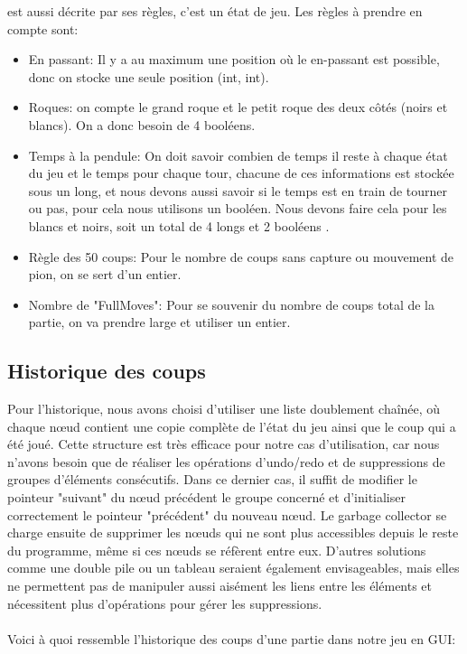 \documentclass{article}
\begin{document}
est aussi décrite par ses règles, c'est un état de jeu. Les règles à prendre en compte sont:\\
\begin{itemize}
   \item En passant: Il y a au maximum une position où le en-passant est possible, donc on stocke une seule position (int, int).
    \item Roques: on compte le grand roque et le petit roque des deux côtés (noirs et blancs). On a donc besoin de 4 booléens.
   \item Temps à la pendule: On doit savoir combien de temps il reste à chaque état du jeu et le temps pour chaque tour, chacune de ces informations est stockée sous un long, et nous devons aussi savoir si le temps est en train de tourner ou pas, pour cela nous utilisons un booléen. Nous devons faire cela pour les blancs et noirs, soit un total de 4 longs et 2 booléens .
   \item Règle des 50 coups: Pour le nombre de coups sans capture ou mouvement de pion, on se sert d’un entier.
   \item Nombre de "FullMoves": Pour se souvenir du nombre de coups total de la partie, on va prendre large et utiliser un entier.\\
\end{itemize}

\subsection{Historique des coups}
\par Pour l'historique, nous avons choisi d'utiliser une liste doublement chaînée, où chaque nœud contient une copie complète de l'état du jeu ainsi que le coup qui a été joué.
Cette structure est très efficace pour notre cas d'utilisation, car nous n'avons besoin que de réaliser les opérations d'undo/redo et de suppressions de groupes d'éléments consécutifs. Dans ce dernier cas, il suffit de modifier le pointeur "suivant" du nœud précédent le groupe concerné et d'initialiser correctement le pointeur "précédent" du nouveau nœud. Le garbage collector se charge ensuite de supprimer les nœuds qui ne sont plus accessibles depuis le reste du programme, même si ces nœuds se réfèrent entre eux.
D'autres solutions comme une double pile ou un tableau seraient également envisageables, mais elles ne permettent pas de manipuler aussi aisément les liens entre les éléments et nécessitent plus d'opérations pour gérer les suppressions.
\\
\\Voici à quoi ressemble l'historique des coups d'une partie dans notre jeu en GUI:\\
\end{document}
